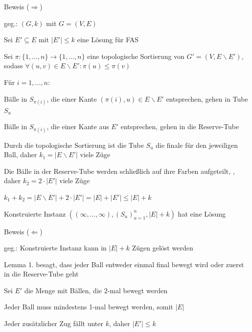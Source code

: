 \documentclass{beamer}
\begin{document}
\begin{frame}{Beweis (\glqq $\Rightarrow$\grqq)}
\begin{pointlist}
\item geg.: $(G,k)$ mit $G=(V,E)$
\item Sei $E'\subseteq E$ mit $|E'| \leq k$ eine Lösung für FAS
\item Sei $\pi:\{1,\dots,n\}\rightarrow \{1,\dots,n\}$ eine topologische Sortierung von $G'=(V, E\backslash E')$, sodass $\forall (u,v)\in E\backslash E': \pi(u)\leq \pi(v)$ 
\item Für $i=1,\dots,n$:
\begin{arrowlist}
\item Bälle in $S_{\pi(i)}$, die einer Kante $(\pi(i),u)\in E\backslash E'$ entsprechen, gehen in Tube $S_u$
\item Bälle in $S_{\pi(i)}$, die einer Kante aus $E'$ entsprechen, gehen in die Reserve-Tube 
\end{arrowlist}
\item Durch die topologische Sortierung ist die Tube $S_u$ die finale für den jeweiligen Ball, daher $k_1 = |E\backslash E'|$ viele Züge
\item Die Bälle in der Reserve-Tube werden schließlich auf ihre Farben aufgeteilt, , daher $k_2 = 2\cdot |E'|$ viele Züge
\item $k_1 + k_2 =  |E\backslash E'| + 2\cdot |E'| = |E| + |E'| \leq |E| + k$
\item Konstruierte Instanz $((\infty, \dots, \infty), (S_u)_{u=1}^n, |E|+k)$ hat eine Lösung
\end{pointlist}
\end{frame}

\begin{frame}{Beweis (\glqq $\Leftarrow$\grqq)}
\begin{pointlist}
\item geg.: Konstruierte Instanz kann in $|E|+k$ Zügen gelöst werden
\item Lemma 1. besagt, dass jeder Ball entweder einmal final bewegt wird oder zuerst in die Reserve-Tube geht
\item Sei $E'$ die Menge mit Bällen, die 2-mal bewegt werden
\item Jeder Ball muss mindestens 1-mal bewegt werden, somit $|E|$
\item Jeder zusätzlicher Zug fällt unter $k$, daher $|E'|\leq k$
\end{pointlist}
\end{frame}
\end{document}
